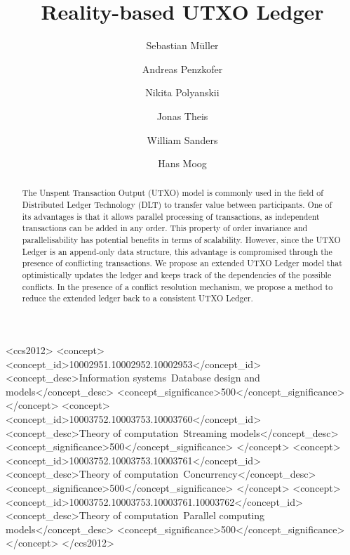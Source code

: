 \documentclass[11pt]{article}
\theoremstyle{plain}
\theoremstyle{definition}
\numberwithin{definition}{section}
\numberwithin{lemma}{section}
\numberwithin{ass}{section}
\numberwithin{remark}{section}
\numberwithin{example}{section}
\numberwithin{proposition}{section}
\numberwithin{theorem}{section}
\begin{document}
\title{Reality-based UTXO Ledger}


\author[1]{Sebastian M\"uller}


\author[2]{Andreas Penzkofer}
\author[2]{Nikita Polyanskii}
\author[2]{Jonas Theis}
\author[2]{William Sanders}
\author[2]{Hans Moog}


\maketitle




\begin{abstract}
The Unspent Transaction Output (UTXO) model is commonly used in the  field of Distributed Ledger Technology (DLT) to transfer value between participants. One of its advantages is that it allows parallel processing of transactions, as independent transactions can be added in any order. This property of order invariance and parallelisability has potential benefits in terms of scalability. However, since the UTXO Ledger is an append-only data structure, this advantage is compromised through the presence of conflicting transactions. We propose an extended UTXO Ledger model that optimistically updates the ledger and keeps track of the dependencies of the possible conflicts. In the presence of a conflict resolution mechanism, we propose a method to reduce the extended ledger back to a consistent UTXO Ledger. 
\end{abstract}


\iffalse
\begin{CCSXML}
<ccs2012>
   <concept>
       <concept_id>10002951.10002952.10002953</concept_id>
       <concept_desc>Information systems~Database design and models</concept_desc>
       <concept_significance>500</concept_significance>
       </concept>
   <concept>
       <concept_id>10003752.10003753.10003760</concept_id>
       <concept_desc>Theory of computation~Streaming models</concept_desc>
       <concept_significance>500</concept_significance>
       </concept>
   <concept>
       <concept_id>10003752.10003753.10003761</concept_id>
       <concept_desc>Theory of computation~Concurrency</concept_desc>
       <concept_significance>500</concept_significance>
       </concept>
   <concept>
       <concept_id>10003752.10003753.10003761.10003762</concept_id>
       <concept_desc>Theory of computation~Parallel computing models</concept_desc>
       <concept_significance>500</concept_significance>
       </concept>
 </ccs2012>
\end{CCSXML}
\end{document}
